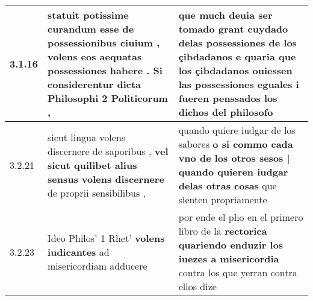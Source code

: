 \begin{tabular}{|p{1cm}|p{6.5cm}|p{6.5cm}|}

\hline
3.1.16 & statuit potissime curandum esse de possessionibus ciuium , \textbf{ volens eos aequatas possessiones habere . } Si considerentur dicta Philosophi 2 Politicorum , & que much deuia ser tomado grant cuydado delas possessiones de los çibdadanos \textbf{ e quaria que los çibdadanos ouiessen las possessiones eguales } i fueren penssados los dichos del philosofo \\\hline
3.2.21 & sicut lingua volens discernere de saporibus , \textbf{ vel sicut quilibet alius sensus volens discernere } de proprii sensibilibus , & quando quiere iudgar de los sabores \textbf{ o si commo cada vno de los otros sesos | quando quieren iudgar delas otras cosas } que sienten propriamente \\\hline
3.2.23 & Ideo Philos’ 1 Rhet’ \textbf{ volens iudicantes } ad misericordiam adducere & por ende el pho en el primero libro de la \textbf{ rectorica quariendo enduzir los iuezes a misericordia } contra los que yerran contra ellos dize \\\hline

\end{tabular}
